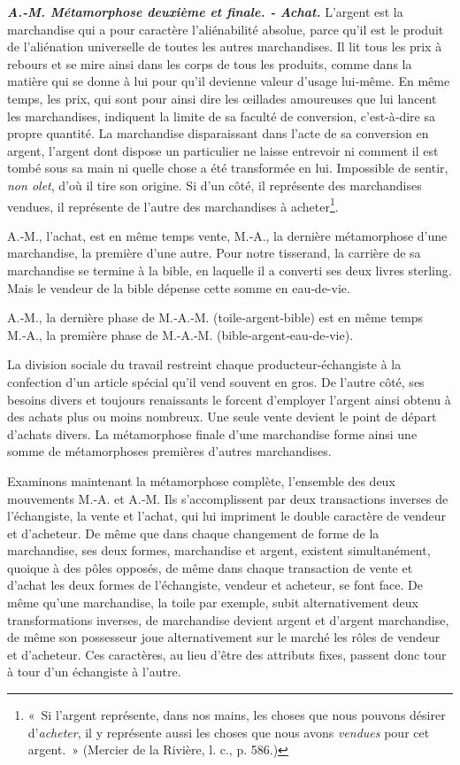 \documentclass[french,twoside]{book} %
\begin{document}
\textbf{\emph{A.‑M. Métamorphose deuxième et finale. ‑ Achat.}} L’argent est la marchandise qui a pour caractère l’aliénabilité absolue, parce qu’il est le produit de l’aliénation universelle de toutes les autres marchandises. Il lit tous les prix à rebours et se mire ainsi dans les corps de tous les produits, comme dans la matière qui se donne à lui pour qu’il devienne valeur d’usage lui‑même. En même temps, les prix, qui sont pour ainsi dire les œillades amoureuses que lui lancent les marchandises, indiquent la limite de sa faculté de conversion, c’est‑à‑dire sa propre quantité. La marchandise disparaissant dans l’acte de sa conversion en argent, l’argent dont dispose un particulier ne laisse entrevoir ni comment il est tombé sous sa main ni quelle chose a été transformée en lui. Impossible de sentir, \emph{non olet}, d’où il tire son origine. Si d’un côté, il représente des marchandises vendues, il représente de l’autre des marchandises à acheter\footnote{« Si l’argent représente, dans nos mains, les choses que nous pouvons désirer d’\emph{acheter}, il y représente aussi les choses que nous avons \emph{vendues} pour cet argent. » (Mercier de la Rivière, l. c., p. 586.)}.\par
A.‑M., l’achat, est en même temps vente, M.‑A., la dernière métamorphose d’une marchandise, la première d’une autre. Pour notre tisserand, la carrière de sa marchandise se termine à la bible, en laquelle il a converti ses deux livres sterling. Mais le vendeur de la bible dépense cette somme en eau‑de-vie.\par
A.‑M., la dernière phase de M.‑A.‑M. (toile‑argent‑bible) est en même temps M.‑A., la première phase de M.-A.-M. (bible‑argent‑eau‑de‑vie).\par
La division sociale du travail restreint chaque producteur-échangiste à la confection d’un article spécial qu’il vend souvent en gros. De l’autre côté, ses besoins divers et toujours renaissants le forcent d’employer l’argent ainsi obtenu à des achats plus ou moins nombreux. Une seule vente devient le point de départ d’achats divers. La métamorphose finale d’une marchandise forme ainsi une somme de métamorphoses premières d’autres marchandises.\par
Examinons maintenant la métamorphose complète, l’ensemble des deux mouvements M.‑A. et A.‑M. Ils s’accomplissent par deux transactions inverses de l’échangiste, la vente et l’achat, qui lui impriment le double caractère de vendeur et d’acheteur. De même que dans chaque changement de forme de la marchandise, ses deux formes, marchandise et argent, existent simultanément, quoique à des pôles opposés, de même dans chaque transaction de vente et d’achat les deux formes de l’échangiste, vendeur et acheteur, se font face. De même qu’une marchandise, la toile par exemple, subit alternativement deux transformations inverses, de marchandise devient argent et d’argent marchandise, de même son possesseur joue alternativement sur le marché les rôles de vendeur et d’acheteur. Ces caractères, au lieu d’être des attributs fixes, passent donc tour à tour d’un échangiste à l’autre.\par
\end{document}
